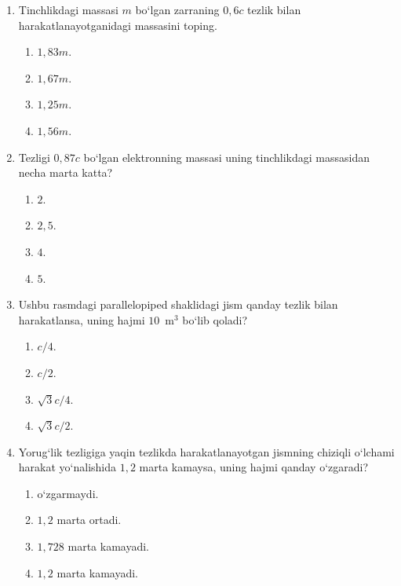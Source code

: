 \begin{enumerate}
\item Tinchlikdagi massasi $m$ bo‘lgan zarraning $0,6c$ tezlik bilan harakatlanayotganidagi massasini toping.
\begin{enumerate}[label=\Alph*)]
\item $1,83m$.
\item $1,67m$.
\item $1,25m$.
\item $1,56m$.
\end{enumerate}

\item Tezligi $0,87c$ bo‘lgan elektronning massasi uning tinchlikdagi massasidan necha marta katta?
\begin{enumerate}[label=\Alph*)]
\item $2$.
\item $2,5$.
\item $4$.
\item $5$.
\end{enumerate}

\item Ushbu rasmdagi parallelopiped shaklidagi jism qanday tezlik bilan harakatlansa, uning hajmi $10$~m$^3$ bo‘lib qoladi?

\begin{center}
\end{center}

\begin{enumerate}[label=\Alph*)]
\item $c/4$.
\item $c/2$.
\item $\sqrt{3}c/4$.
\item $\sqrt{3}c/2$.
\end{enumerate}

\item Yorug‘lik tezligiga yaqin tezlikda harakatlanayotgan jismning chiziqli o‘lchami harakat yo‘nalishida $1,2$ marta kamaysa, uning hajmi qanday o‘zgaradi?
\begin{enumerate}[label=\Alph*)]
\item o‘zgarmaydi.
\item $1,2$ marta ortadi.
\item $1,728$ marta kamayadi.
\item $1,2$ marta kamayadi.
\end{enumerate}


\end{enumerate}
